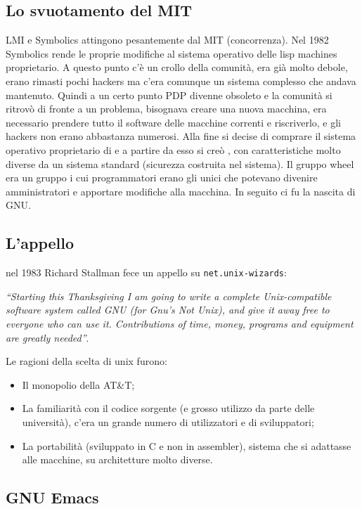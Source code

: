 \subsection{Lo svuotamento del MIT}

LMI e Symbolics attingono pesantemente dal MIT (concorrenza). Nel 1982 Symbolics rende le proprie modifiche al sistema operativo delle lisp machines proprietario. A questo punto c'è un crollo della comunità, era già molto debole, erano rimasti pochi hackers ma c'era comunque un sistema complesso che andava mantenuto. 
Quindi a un certo punto PDP divenne obsoleto e la comunità si ritrovò di fronte a un problema, bisognava creare una nuova macchina, era necessario prendere tutto il software delle macchine correnti e riscriverlo, e gli hackers non erano abbastanza numerosi. Alla fine si decise di comprare il sistema operativo proprietario di  e a partire da esso si creò , con caratteristiche molto diverse da un sistema standard (sicurezza costruita nel sistema). 
Il gruppo wheel era un gruppo i cui programmatori erano gli unici che potevano divenire amministratori e apportare modifiche alla macchina. In seguito ci fu la nascita di GNU.

\subsection{L'appello}

nel 1983 Richard Stallman fece un appello su \texttt{net.unix-wizards}:

\begin{center}

\textit{``Starting this Thanksgiving I am going to write a complete Unix-compatible software system called GNU (for Gnu’s Not Unix), and give it away free to everyone who can use it. Contributions of time, money, programs and equipment are greatly needed''}.

\end{center}

Le ragioni della scelta di unix furono:

\begin{itemize}

\item Il monopolio della AT&T;
\item La familiarità con il codice sorgente (e grosso utilizzo da parte delle università), c'era un grande numero di utilizzatori e di sviluppatori;
\item La portabilità (sviluppato in C e non in assembler), sistema che si adattasse alle macchine, su architetture molto diverse.

\end{itemize}

\subsection{GNU Emacs}

